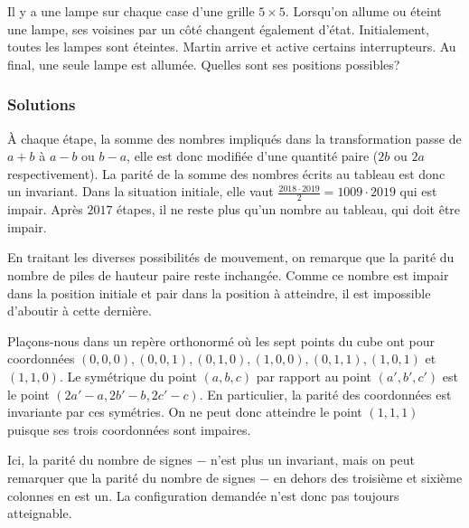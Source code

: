 \begin{exo}
Il y a une lampe sur chaque case d'une grille $5\times5$. Lorsqu'on allume ou éteint une lampe, ses voisines par un côté changent également d'état. Initialement, toutes les lampes sont éteintes. Martin arrive et active certains interrupteurs. Au final, une seule lampe est allumée. Quelles sont ses positions possibles?
\end{exo}

\subsubsection{Solutions}

\begin{sol}
À chaque étape, la somme des nombres impliqués dans la transformation passe de $a+b$ à $a-b$ ou $b-a$, elle est donc modifiée d'une quantité paire ($2b$ ou $2a$ respectivement). La parité de la somme des nombres écrits au tableau est donc un invariant. Dans la situation initiale, elle vaut $\frac{2018\cdot 2019}2=1009\cdot 2019$ qui est impair. Après $2017$ étapes, il ne reste plus qu'un nombre au tableau, qui doit être impair.
\end{sol}

\begin{sol}
En traitant les diverses possibilités de mouvement, on remarque que la parité du nombre de piles de hauteur paire reste inchangée. Comme ce nombre est impair dans la position initiale et pair dans la position à atteindre, il est impossible d'aboutir à cette dernière.
\end{sol}

\begin{sol}
Plaçons-nous dans un repère orthonormé où les sept points du cube ont pour coordonnées $(0,0,0),(0,0,1),(0,1,0),(1,0,0),(0,1,1),(1,0,1)$ et $(1,1,0)$. Le symétrique du point $(a,b,c)$ par rapport au point $(a',b',c')$ est le point $(2a'-a,2b'-b,2c'-c)$. En particulier, la parité des coordonnées est invariante par ces symétries. On ne peut donc atteindre le point $(1,1,1)$ puisque ses trois coordonnées sont impaires.
\end{sol}

\begin{sol}
Ici, la parité du nombre de signes $-$ n'est plus un invariant, mais on peut remarquer que la parité du nombre de signes $-$ en dehors des troisième et sixième colonnes en est un. La configuration demandée n'est donc pas toujours atteignable.
\end{sol}

